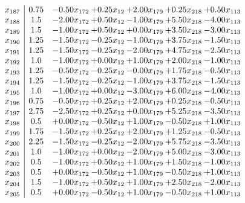 \documentclass[8pt]{article}
\begin{document}
\[\begin{array}{c| c c@{\hskip 2pt} c@{\hskip 2pt} c@{\hskip 2pt} c@{\hskip 2pt} c@{\hskip 2pt} }
 x_{187}   &  0.75 & -0.50 x_{172} & +  0.25 x_{12} & +  2.00 x_{179} & +  0.25 x_{218} & +  0.50 x_{113}\\
 x_{188}   &  1.5 & -2.00 x_{172} & +  0.50 x_{12} & -1.00 x_{179} & +  5.50 x_{218} & -4.00 x_{113}\\
 x_{189}   &  1.5 & -1.00 x_{172} & +  0.50 x_{12} & +  0.00 x_{179} & +  3.50 x_{218} & -3.00 x_{113}\\
 x_{190}   &  1.25 & -1.50 x_{172} & -0.25 x_{12} & -1.00 x_{179} & +  3.75 x_{218} & -1.50 x_{113}\\
 x_{191}   &  1.25 & -1.50 x_{172} & -0.25 x_{12} & -2.00 x_{179} & +  4.75 x_{218} & -2.50 x_{113}\\
 x_{192}   &  1.0 & -1.00 x_{172} & +  0.00 x_{12} & +  1.00 x_{179} & +  2.00 x_{218} & -1.00 x_{113}\\
 x_{193}   &  1.25 & -0.50 x_{172} & -0.25 x_{12} & -0.00 x_{179} & +  1.75 x_{218} & -0.50 x_{113}\\
 x_{194}   &  1.25 & -1.50 x_{172} & -0.25 x_{12} & -1.00 x_{179} & +  3.75 x_{218} & -1.50 x_{113}\\
 x_{195}   &  1.0 & -1.00 x_{172} & +  0.00 x_{12} & -3.00 x_{179} & +  6.00 x_{218} & -4.00 x_{113}\\
 x_{196}   &  0.75 & -0.50 x_{172} & +  0.25 x_{12} & +  2.00 x_{179} & +  0.25 x_{218} & -0.50 x_{113}\\
 x_{197}   &  2.75 & -2.50 x_{172} & +  0.25 x_{12} & +  0.00 x_{179} & +  5.25 x_{218} & -3.50 x_{113}\\
 x_{198}   &  0.5 & +  0.00 x_{172} & -0.50 x_{12} & +  1.00 x_{179} & -0.50 x_{218} & +  1.00 x_{113}\\
 x_{199}   &  1.75 & -1.50 x_{172} & +  0.25 x_{12} & +  2.00 x_{179} & +  1.25 x_{218} & -0.50 x_{113}\\
 x_{200}   &  2.25 & -1.50 x_{172} & -0.25 x_{12} & -2.00 x_{179} & +  5.75 x_{218} & -3.50 x_{113}\\
 x_{201}   &  1.0 & -1.00 x_{172} & +  0.00 x_{12} & -2.00 x_{179} & +  5.00 x_{218} & -3.00 x_{113}\\
 x_{202}   &  0.5 & -1.00 x_{172} & +  0.50 x_{12} & +  1.00 x_{179} & +  1.50 x_{218} & -1.00 x_{113}\\
 x_{203}   &  0.5 & +  0.00 x_{172} & -0.50 x_{12} & +  1.00 x_{179} & -0.50 x_{218} & +  1.00 x_{113}\\
 x_{204}   &  1.5 & -1.00 x_{172} & +  0.50 x_{12} & +  1.00 x_{179} & +  2.50 x_{218} & -2.00 x_{113}\\
 x_{205}   &  0.5 & +  0.00 x_{172} & -0.50 x_{12} & +  1.00 x_{179} & -0.50 x_{218} & +  1.00 x_{113}\\

\end{array}\]
\end{document}
